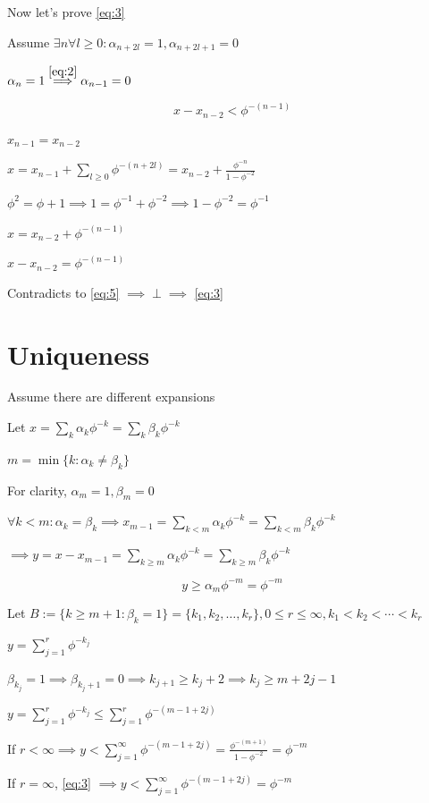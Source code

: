 \documentclass{article}
\begin{document}
Now let's prove \eqref{eq:3}

Assume $\exists n \forall l\geq 0: \alpha_{n+2l} = 1, \alpha_{n+2l + 1} = 0$

$\alpha_n = 1 \overset{\eqref{eq:2}}{\implies} \alpha_{n-1} = 0$

\[x - x_{n-2} < \phi^{-(n-1)} \tag{5}\label{eq:5}\]

$x_{n-1} = x_{n-2}$

$x = x_{n-1} + \sum_{l \geq 0}\phi^{-(n+2l)} = x_{n-2} + \frac{\phi^{-n}}{1-\phi^{-2}}$

$\phi^2 = \phi + 1 \implies 1 = \phi^{-1} + \phi^{-2} \implies 1 - \phi^{-2} = \phi^{-1}$

$x = x_{n-2} + \phi^{-(n-1)}$

$x - x_{n-2} = \phi^{-(n-1)}$

Contradicts to \eqref{eq:5} $\implies \perp \implies$ \eqref{eq:3}

\section*{Uniqueness}

Assume there are different expansions

Let $x = \sum_k \alpha_k \phi^{-k} = \sum_k \beta_k \phi^{-k}$

$m = \min \{k: \alpha_k \neq \beta_k \}$

For clarity, $\alpha_m = 1, \beta_m = 0$

$\forall k<m: \alpha_k = \beta_k \implies x_{m-1} = \sum_{k<m} \alpha_k \phi^{-k} = \sum_{k<m} \beta_k \phi^{-k}$

$\implies y = x - x_{m-1} = \sum_{k \geq m} \alpha_k \phi^{-k} = \sum_{k \geq m} \beta_k \phi^{-k}$

\[y \geq \alpha_{m} \phi^{-m} = \phi^{-m} \tag{6}\label{eq:6}\]

Let $B := \{ k \geq m + 1: \beta_k = 1 \} = \{ k_1, k_2, \ldots, k_r \}, 0 \leq r \leq \infty, k_1 < k_2 < \cdots < k_r$

$y = \sum_{j = 1}^r \phi^{-k_j}$

$\beta_{k_j} = 1 \implies \beta_{k_j+1} = 0 \implies k_{j+1} \geq k_j + 2 \implies k_j \geq m + 2j - 1$

$y = \sum_{j = 1}^r \phi^{-k_j} \leq \sum_{j = 1}^r \phi^{-(m-1+2j)}$

If $r < \infty \implies y < \sum_{j = 1}^\infty \phi^{-(m-1+2j)} = \frac{\phi^{-(m+1)}}{1-\phi^{-2}} = \phi^{-m}$

If $r = \infty$, \eqref{eq:3} $\implies y < \sum_{j = 1}^\infty \phi^{-(m-1+2j)} = \phi^{-m}$
\end{document}
